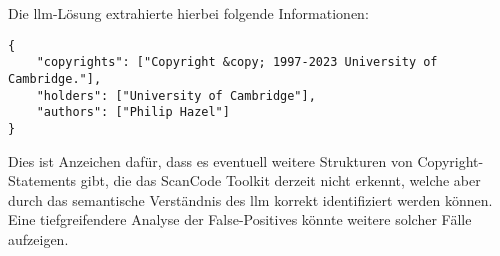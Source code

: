 Die \gls{llm}-Lösung extrahierte hierbei folgende Informationen:

\begin{lstlisting}[keepspaces=true]
{
    "copyrights": ["Copyright &copy; 1997-2023 University of Cambridge."],
    "holders": ["University of Cambridge"],
    "authors": ["Philip Hazel"]
}
\end{lstlisting}

Dies ist Anzeichen dafür, dass es eventuell weitere Strukturen von Copyright-Statements gibt, die das ScanCode Toolkit derzeit nicht erkennt, welche aber durch das semantische Verständnis des \gls{llm} korrekt identifiziert werden können.
Eine tiefgreifendere Analyse der False-Positives könnte weitere solcher Fälle aufzeigen.
